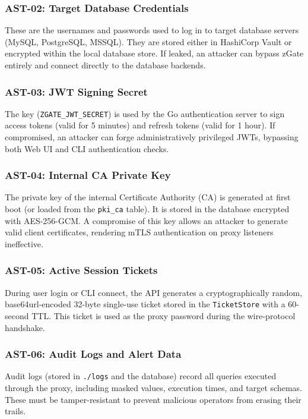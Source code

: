 \subsubsection{AST-02: Target Database Credentials}
These are the usernames and passwords used to log in to target database servers (MySQL, PostgreSQL, MSSQL). They are stored either in HashiCorp Vault or encrypted within the local database store. If leaked, an attacker can bypass zGate entirely and connect directly to the database backends.

\subsubsection{AST-03: JWT Signing Secret}
The key (\texttt{ZGATE\_JWT\_SECRET}) is used by the Go authentication server to sign access tokens (valid for 5 minutes) and refresh tokens (valid for 1 hour). If compromised, an attacker can forge administratively privileged JWTs, bypassing both Web UI and CLI authentication checks.

\subsubsection{AST-04: Internal CA Private Key}
The private key of the internal Certificate Authority (CA) is generated at first boot (or loaded from the \texttt{pki\_ca} table). It is stored in the database encrypted with AES-256-GCM. A compromise of this key allows an attacker to generate valid client certificates, rendering mTLS authentication on proxy listeners ineffective.

\subsubsection{AST-05: Active Session Tickets}
During user login or CLI connect, the API generates a cryptographically random, base64url-encoded 32-byte single-use ticket stored in the \texttt{TicketStore} with a 60-second TTL. This ticket is used as the proxy password during the wire-protocol handshake.

\subsubsection{AST-06: Audit Logs and Alert Data}
Audit logs (stored in \texttt{./logs} and the database) record all queries executed through the proxy, including masked values, execution times, and target schemas. These must be tamper-resistant to prevent malicious operators from erasing their trails.

